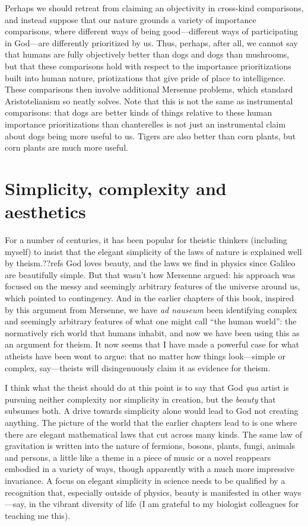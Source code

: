 Perhaps we should retreat from claiming an objectivity in cross-kind comparisons, and instead suppose that our nature 
grounds a variety of importance comparisons, where different ways of being good---different ways of participating in 
God---are differently prioritized by us. Thus, perhaps, after all, we cannot say that humans are fully objectively 
better than dogs and dogs than mushrooms, but that these comparisons hold with respect to the importance prioritizations
built into human nature, priotizations that give pride of place to intelligence. These comparisons then involve 
additional Mersenne problems, which standard Aristotelianism so neatly solves. Note that this is not the same as 
instrumental comparisons: that dogs are better kinds of things relative to these human importance prioritizations than
chanterelles is not just an instrumental claim about dogs being more useful to us. Tigers are also better than corn plants,
but corn plants are much more useful.

\section{Simplicity, complexity and aesthetics}
For a number of centuries, it has been popular for theistic thinkers (including myself) to insist that the elegant simplicity of the laws of nature 
is explained well by theism.??refs God loves beauty, and the laws we find in physics since Galileo are beautifully simple.
But that wasn't how Mersenne argued: his approach was focused on the messy and seemingly arbitrary features of the universe
around us, which pointed to contingency. And in the earlier chapters of this book, inspired by this argument from Mersenne, we have 
\textit{ad nauseum} been identifying complex and seemingly arbitrary features of what one might call ``the human world'': 
the normatively rich world that humans inhabit, and now we have been using this as an argument for theism. It now seems that I have made a powerful case for what atheists have been wont to argue: that no matter how things look---simple or complex, say---theists will disingenuously claim it as evidence for theism.

I think what the theist should do at this point is to say that God \textit{qua} artist is pursuing neither complexity nor simplicity 
in creation, but the \textit{beauty} that subsumes both. A drive towards simplicity alone would lead to God not creating anything. 
The picture of the world that the earlier chapters lead to is one where there 
are elegant mathematical laws that cut across many kinds. The same law of gravitation is written into the nature of fermions, bosons, plants, fungi, animals and persons, a little like a theme in a piece of music or a novel reappears embodied in a variety 
of ways, though apparently with a much more impressive invariance. A focus on elegant simplicity in science needs to be qualified 
by a recognition that, especially outside of physics, beauty is manifested in other ways---say, in the vibrant diversity of 
life (I am grateful to my biologist colleagues for teaching me this). 

